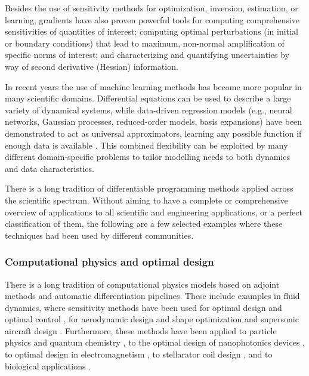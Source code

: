 Besides the use of sensitivity methods for optimization, inversion, estimation, or learning, gradients have also proven powerful tools for computing comprehensive sensitivities of quantities of interest; computing optimal perturbations (in initial or boundary conditions) that lead to maximum, non-normal amplification of specific norms of interest; and characterizing and quantifying uncertainties by way of second derivative (Hessian) information.

In recent years the use of machine learning methods has become more popular in many scientific domains. 
Differential equations can be used to describe a large variety of dynamical systems, while data-driven regression models (e.g., neural networks, Gaussian processes, reduced-order models, basis expansions) have been demonstrated to act as universal approximators, learning any possible function if enough data is available \cite{gorban_1998}. 
This combined flexibility can be exploited by many different domain-specific problems to tailor modelling needs to both dynamics and data characteristics.

There is a long tradition of differentiable programming methods applied across the scientific spectrum. 
Without aiming to have a complete or comprehensive overview of applications to all scientific and engineering applications, or a perfect classification of them, the following are a few selected examples where these techniques had been used by different communities. 

\subsubsection{Computational physics and optimal design}

There is a long tradition of computational physics models based on adjoint methods and automatic differentiation pipelines. These include examples in fluid dynamics, where sensitivity methods have been used for optimal design and optimal control
\cite{lions1971optimal, pironneau2005optimal}, for aerodynamic design and shape optimization
\cite{Jameson_1988,Giles_Pierce_2000, mohammadi2009applied,allaire2014shape} and 
supersonic aircraft design \cite{hu2010supersonic, fike2013multi}.
Furthermore, these methods have been applied to particle physics \cite{Dorigo.2022} and quantum chemistry \cite{Arrazola.2021}, to the optimal design of nanophotonics devices  \cite{Molesky_Lin_Piggott_Jin_Vucković_Rodriguez_2018}, to optimal design in electromagnetism \cite{Georgieva_Glavic_Bakr_Bandler_2002}, to stellarator coil design \cite{McGreivy_stellarator_2021}, and to biological applications \cite{Strouwen2022}.

